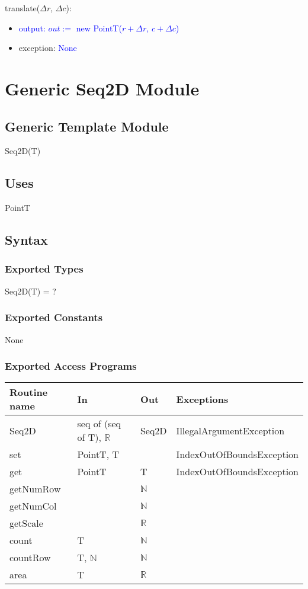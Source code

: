 \documentclass[12pt]{article}
\begin{document}
\noindent translate($\Delta r$, $\Delta c$):
\begin{itemize}
\item \textcolor{blue}{output: $out := $ new PointT($r + \Delta r$, $c + \Delta c$)}
\item exception: \textcolor{blue}{None}
\end{itemize}

\newpage

\section* {Generic Seq2D Module}

\subsection* {Generic Template Module}

Seq2D(T)

\subsection* {Uses}

PointT

\subsection* {Syntax}

\subsubsection* {Exported Types}

Seq2D(T) = ?

\subsubsection* {Exported Constants}

None

\subsubsection* {Exported Access Programs}

\begin{tabular}{| l | l | l | p{6cm} |}
\hline
\textbf{Routine name} & \textbf{In} & \textbf{Out} & \textbf{Exceptions}\\
\hline
Seq2D & seq of (seq of T), $\mathbb{R}$ & Seq2D & IllegalArgumentException\\
\hline
set & PointT, T & ~ & IndexOutOfBoundsException\\
\hline
get & PointT & T & IndexOutOfBoundsException\\
\hline
getNumRow & ~ & $\mathbb{N}$ & \\
\hline
getNumCol & ~ & $\mathbb{N}$ & \\
\hline
getScale & ~ & $\mathbb{R}$ & \\
\hline
count & T & $\mathbb{N}$ & \\
\hline
countRow & T, $\mathbb{N}$ & $\mathbb{N}$ & \\
\hline
area & T & $\mathbb{R}$ & \\
\hline
\end{tabular}
\end{document}
